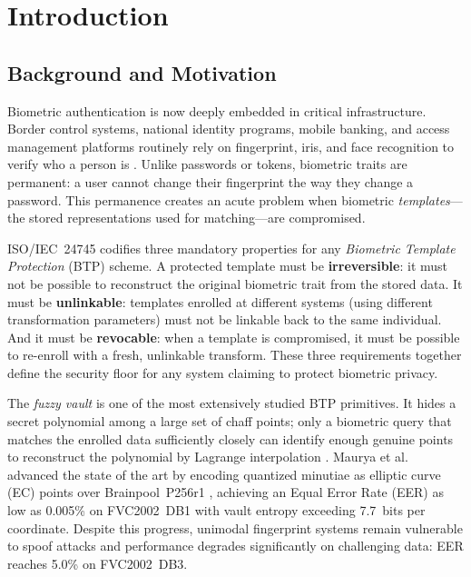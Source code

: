 \chapter{Introduction}
\label{ch:introduction}

\section{Background and Motivation}

Biometric authentication is now deeply embedded in critical infrastructure.
Border control systems, national identity programs, mobile banking, and access
management platforms routinely rely on fingerprint, iris, and face recognition to
verify who a person is \cite{jain2004multibiometrics}. Unlike passwords or tokens,
biometric traits are permanent: a user cannot change their fingerprint the way they
change a password. This permanence creates an acute problem when biometric
\emph{templates}---the stored representations used for matching---are compromised.

ISO/IEC~24745 \cite{iso24745} codifies three mandatory properties for any
\emph{Biometric Template Protection} (BTP) scheme. A protected template must be
\textbf{irreversible}: it must not be possible to reconstruct the original
biometric trait from the stored data. It must be \textbf{unlinkable}: templates
enrolled at different systems (using different transformation parameters) must not
be linkable back to the same individual. And it must be \textbf{revocable}: when a
template is compromised, it must be possible to re-enroll with a fresh, unlinkable
transform. These three requirements together define the security floor for any
system claiming to protect biometric privacy.

The \emph{fuzzy vault} \cite{juels2002fuzzy} is one of the most extensively studied
BTP primitives. It hides a secret polynomial among a large set of chaff points;
only a biometric query that matches the enrolled data sufficiently closely can
identify enough genuine points to reconstruct the polynomial by Lagrange
interpolation \cite{rathgeb2011survey}. Maurya et al.\ \cite{maurya2025enhancing}
advanced the state of the art by encoding quantized minutiae as elliptic curve (EC)
points over Brainpool~P256r1 \cite{rfc5639}, achieving an Equal Error Rate (EER)
as low as 0.005\% on FVC2002~DB1 with vault entropy exceeding 7.7~bits per
coordinate. Despite this progress, unimodal fingerprint systems remain vulnerable
to spoof attacks and performance degrades significantly on challenging data: EER
reaches 5.0\% on FVC2002~DB3.

